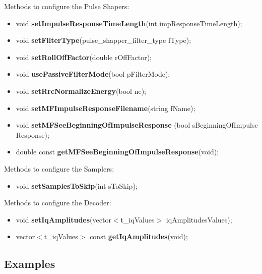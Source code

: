 Methods to configure the Pulse Shapers:
\begin{itemize}
     \item void \textbf{setImpulseResponseTimeLength}(int impResponseTimeLength);
     \item void \textbf{setFilterType}(pulse\_shapper\_filter\_type fType);
     \item void \textbf{setRollOffFactor}(double rOffFactor);
     \item void \textbf{usePassiveFilterMode}(bool pFilterMode);
     \item void \textbf{setRrcNormalizeEnergy}(bool ne);
     \item void \textbf{setMFImpulseResponseFilename}(string fName);
     \item void \textbf{setMFSeeBeginningOfImpulseResponse}
     (bool sBeginningOfImpulse Response);
     \item double const \textbf{getMFSeeBeginningOfImpulseResponse}(void);
\end{itemize}


Methods to configure the Samplers:
\begin{itemize}
     \item void \textbf{setSamplesToSkip}(int sToSkip);
\end{itemize}


Methods to configure the Decoder:
\begin{itemize}
     \item void \textbf{setIqAmplitudes}(vector$<$t\_iqValues$>$ iqAmplitudesValues);
     \item vector$<$t\_iqValues$>$ const \textbf{getIqAmplitudes}(void);
\end{itemize}



\subsection*{Examples}

